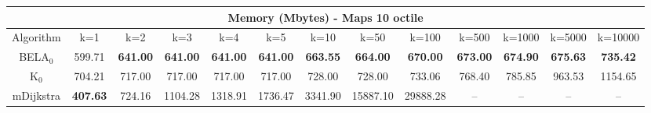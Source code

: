 \begin{tabular}{c|cccccccccccc}\toprule
\multicolumn{13}{c}{Memory (Mbytes) - Maps 10 octile}\\ \midrule
Algorithm & k=1 & k=2 & k=3 & k=4 & k=5 & k=10 & k=50 & k=100 & k=500 & k=1000 & k=5000 & k=10000 \\ \midrule
BELA$_0$ & 599.71 & \textbf{641.00} & \textbf{641.00} & \textbf{641.00} & \textbf{641.00} & \textbf{663.55} & \textbf{664.00} & \textbf{670.00} & \textbf{673.00} & \textbf{674.90} & \textbf{675.63} & \textbf{735.42} \\
K$_0$ & 704.21 & 717.00 & 717.00 & 717.00 & 717.00 & 728.00 & 728.00 & 733.06 & 768.40 & 785.85 & 963.53 & 1154.65 \\
mDijkstra & \textbf{407.63} & 724.16 & 1104.28 & 1318.91 & 1736.47 & 3341.90 & 15887.10 & 29888.28 & -- & -- & -- & -- \\ \bottomrule 
\end{tabular}
